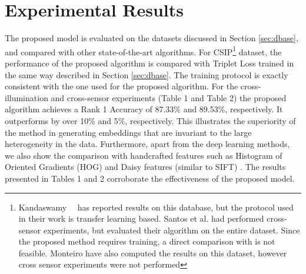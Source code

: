 \documentclass[10pt,twocolumn,letterpaper]{article}
\begin{document}
\section{Experimental Results}
\label{sec:results}
  \vspace{-8pt}
The proposed model is evaluated on the datasets discussed in Section \ref{sec:dbase}, and compared with other state-of-the-art algorithms. For CSIP\footnote{ Kandaswamy~\etal~\cite{kandaswamy2017multi} has reported results on this database, but the protocol used in their work is transfer learning based. Santos et al. \cite{santos2015fusing} had performed cross-sensor experiments, but evaluated their algorithm on the entire dataset. Since the proposed method requires training, a direct comparison with \cite{santos2015fusing} is not feasible. Monteiro \etal \cite{monteiro2015comparative} have also computed the results on this dataset, however cross sensor experiments were not performed} dataset, the performance of the proposed algorithm is compared with Triplet Loss \cite{schroff2015facenet} trained in the same way described in Section \ref{sec:dbase}. The training protocol is exactly consistent with the one used for the proposed algorithm. For the cross-illumination and cross-sensor experiments (Table 1 and Table 2) the proposed algorithm achieves a Rank 1 Accuracy of 87.33\% and 89.53\%, respectively. It outperforms \cite{schroff2015facenet} by over 10\% and 5\%, respectively. This illustrates the superiority of the method in generating embeddings that are invariant to the large heterogeneity in the data. Furthermore, apart from the deep learning methods, we also show the comparison with handcrafted features such as Histogram of Oriented Gradients (HOG) \cite{dalal2005histograms} and Daisy features (similar to SIFT) \cite{tola2010daisy}. The results presented in Tables 
1 and 2 corroborate the effectiveness of the proposed model.
\end{document}
